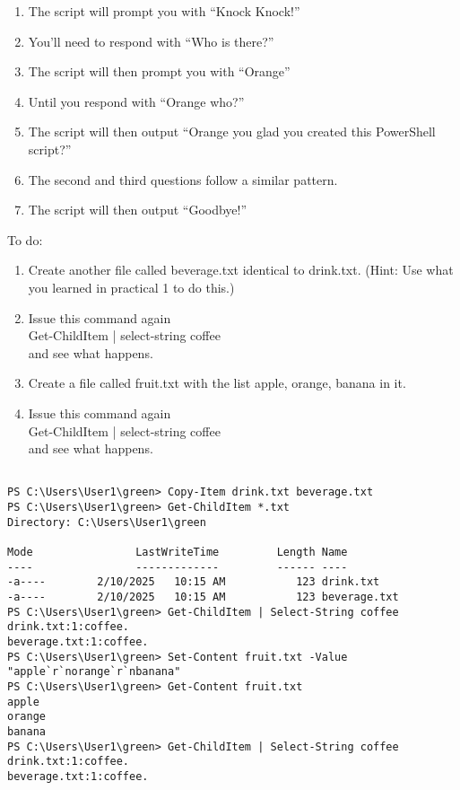 \documentclass[a4paper]{article}
\begin{document}
\begin{enumerate}
    \item The script will prompt you with “Knock Knock!”
    \item You’ll need to respond with “Who is there?”
    \item The script will then prompt you with “Orange”
    \item Until you respond with “Orange who?”
    \item The script will then output “Orange you glad you created this PowerShell script?”
    \item The second and third questions follow a similar pattern.
    \item The script will then output “Goodbye!”
\end{enumerate}
\textcolor{green!50!black}{
To do:
\begin{enumerate}
    \item Create another file called beverage.txt identical to drink.txt.
    (Hint: Use what you learned in practical 1 to do this.)
    \item Issue this command again\\
    Get-ChildItem | select-string coffee\\
    and see what happens.
    \item Create a file called fruit.txt with the list apple, orange, banana in it.
    \item Issue this command again\\
    Get-ChildItem | select-string coffee\\
    and see what happens.
\end{enumerate}
}
\begin{verbatim}

PS C:\Users\User1\green> Copy-Item drink.txt beverage.txt
PS C:\Users\User1\green> Get-ChildItem *.txt
Directory: C:\Users\User1\green

Mode                LastWriteTime         Length Name
----                -------------         ------ ----
-a----        2/10/2025   10:15 AM           123 drink.txt
-a----        2/10/2025   10:15 AM           123 beverage.txt
PS C:\Users\User1\green> Get-ChildItem | Select-String coffee
drink.txt:1:coffee.
beverage.txt:1:coffee.
PS C:\Users\User1\green> Set-Content fruit.txt -Value "apple`r`norange`r`nbanana"
PS C:\Users\User1\green> Get-Content fruit.txt
apple
orange
banana
PS C:\Users\User1\green> Get-ChildItem | Select-String coffee
drink.txt:1:coffee.
beverage.txt:1:coffee.
\end{verbatim}
\end{document}
